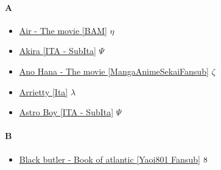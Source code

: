 		\paragraph{A} \hypertarget{FA}{}
			\begin{itemize}
				
				
				\item \href{https://mega.nz/#!1BEAhLAZ!x_gNUHZTHh-ZMZxaVgmaZFKARZTPHwh7ebcBH49oFnc} {Air - The movie [BAM]}  $\eta$   \\
				\item \href{https://mega.nz/#!sKQmSYLS!3fziv2Es_IeBigAOo2NqIUR0cN1v1ZcDTutXqSwgsi4} {Akira [ITA - SubIta]}  $\Psi$   \\
				\item \href{https://mega.nz/#!PgkBXLgZ!WKtvjldKy8Tng40FARM2Qino6FgQQvHTZaV4XRLf8ak} {Ano Hana - The movie [MangaAnimeSekaiFansub]}  $\zeta$   \\
				\item \href{https://mega.nz/#!X9xTTIba!VAhOn8RGaHEn9gn3zieIKvrSqfGuvjP32t7Tp60wj8w} {Arrietty [Ita]}  $\lambda$   \\
				\item \href{https://mega.nz/#!Va5y0baa!95sAGkfadxMYBOu5zhWNaVTT0FbvHvgIuxDdLaPJCKk} {Astro Boy [ITA - SubIta]}  $\Psi$   \\
			
			\end{itemize}
		
		\paragraph{B} \hypertarget{FB}{}
			\begin{itemize}
				
				\item \href{https://mega.nz/#!vvBSSIBS!ao4abUaoeqw3h3BJ76XjbqMoT_qKLUQYRVIZ7m-gCUY} {Black butler - Book of atlantic [Yaoi801 Fansub]}  $\oldstylenums{8}$   \\
				
			\end{itemize}
		
